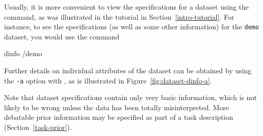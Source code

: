 Usually, it is more convenient to view the specifications for a
dataset using the \dinfo{} command, as was illustrated in the tutorial
in Section~\ref{intro-tutorial}.  For instance, to see the
specifications (as well as some other information) for the
\texttt{demo} dataset, you would use the command\vspace{-5pt}
\begin{Session}
   dinfo /demo 
\end{Session}\vspace{-5pt} 
Further details on individual attributes of the dataset can be
obtained by using the \texttt{-a} option with \dinfo{}, as is
illustrated in Figure~\ref{fig:dataset-dinfo-a}.

Note that dataset specifications contain only very basic information,
which is not likely to be wrong unless the data has been totally
misinterpreted.  More debatable prior information may be specified as
part of a task description (Section~\ref{task-prior}).

